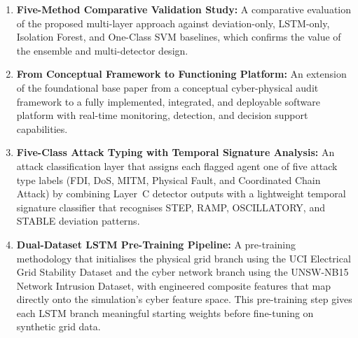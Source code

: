 \begin{enumerate}
    \item \textbf{Five-Method Comparative Validation Study:} A comparative evaluation of the proposed multi-layer approach against deviation-only, LSTM-only, Isolation Forest, and One-Class SVM baselines, which confirms the value of the ensemble and multi-detector design.

    \item \textbf{From Conceptual Framework to Functioning Platform:} An extension of the foundational base paper from a conceptual cyber-physical audit framework to a fully implemented, integrated, and deployable software platform with real-time monitoring, detection, and decision support capabilities.

    \item \textbf{Five-Class Attack Typing with Temporal Signature Analysis:} An attack classification layer that assigns each flagged agent one of five attack type labels (FDI, DoS, MITM, Physical Fault, and Coordinated Chain Attack) by combining Layer~C detector outputs with a lightweight temporal signature classifier that recognises STEP, RAMP, OSCILLATORY, and STABLE deviation patterns.

    \item \textbf{Dual-Dataset LSTM Pre-Training Pipeline:} A pre-training methodology that initialises the physical grid branch using the UCI Electrical Grid Stability Dataset and the cyber network branch using the UNSW-NB15 Network Intrusion Dataset, with engineered composite features that map directly onto the simulation's cyber feature space. This pre-training step gives each LSTM branch meaningful starting weights before fine-tuning on synthetic grid data.
\end{enumerate}
